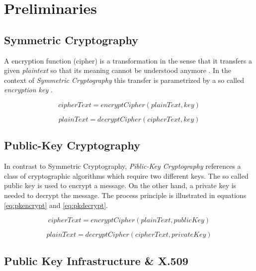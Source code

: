 \chapter{Preliminaries}

\section{Symmetric Cryptography} 

A encryption function (cipher) is a transformation in the sense that it transfers a given \textit{plaintext} so that its meaning cannot be understood anymore \citep[section 1.4]{HAC}. In the context of \textit{Symmetric Cryptography} this transfer is parametrized by a so called \textit{encryption key}  \citep[section 1.5]{HAC}.

\begin{equation} \label{eq:skencrypt}
	cipherText = encryptCipher(plainText, key)
\end{equation}

\begin{equation} \label{eq:skdecrypt}
	plainText = decryptCipher(cipherText, key)
\end{equation}


\section{Public-Key Cryptography}

In contrast to  {Symmetric Cryptography}, \textit{Piblic-Key Cryptography} references a class of cryptographic algorithms which require two different keys. \citep[section 1.8]{HAC} The so called public key is used to encrypt a message. On the other hand, a private key is needed to decrypt the message. The process principle is illustrated in equations \ref{eq:pkencrypt} and \ref{eq:pkdecrypt}. 

\begin{equation} \label{eq:pkencrypt}
	cipherText = encryptCipher(plainText, publicKey)
\end{equation}

\begin{equation} \label{eq:pkdecrypt}
	plainText = decryptCipher(cipherText, privateKey)
\end{equation}


\section{Public Key Infrastructure \&{} X.509}

